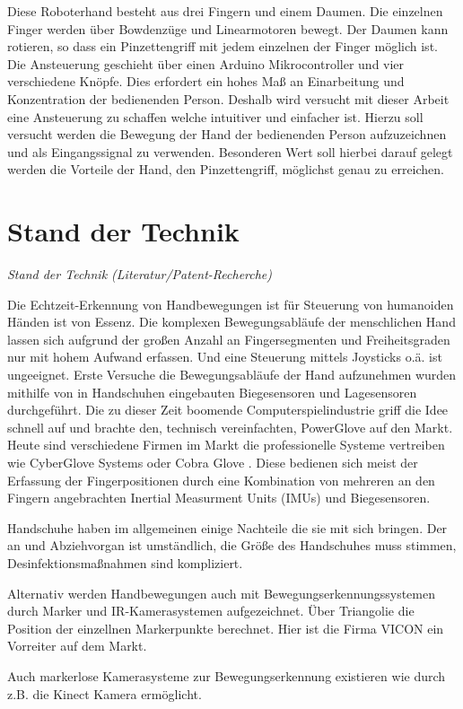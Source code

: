 \documentclass[a4paper,12pt,final]{article} %
\numberwithin{equation}{section} %
\numberwithin{figure}{section} %
\numberwithin{table}{section} %
\begin{document}
Diese Roboterhand besteht aus drei Fingern und einem Daumen. Die einzelnen Finger werden über Bowdenzüge und Linearmotoren bewegt. Der Daumen kann rotieren, so dass ein Pinzettengriff mit jedem einzelnen der Finger möglich ist.
Die Ansteuerung geschieht über einen Arduino Mikrocontroller und vier verschiedene Knöpfe. Dies erfordert ein hohes Maß an Einarbeitung und Konzentration der bedienenden Person.
Deshalb wird versucht mit dieser Arbeit eine Ansteuerung zu schaffen welche intuitiver und einfacher ist. Hierzu soll versucht werden die Bewegung der Hand der bedienenden Person aufzuzeichnen und als Eingangssignal zu verwenden.
Besonderen Wert soll hierbei darauf gelegt werden die Vorteile der Hand, den Pinzettengriff, möglichst genau zu erreichen.
\newpage
\section{Stand der Technik}
\emph{Stand der Technik (Literatur/Patent-Recherche)}

Die Echtzeit-Erkennung von Handbewegungen ist für Steuerung von humanoiden Händen ist von Essenz. Die komplexen Bewegungsabläufe der menschlichen Hand lassen sich aufgrund der großen Anzahl an Fingersegmenten und Freiheitsgraden nur mit hohem Aufwand erfassen. Und eine Steuerung mittels Joysticks o.ä. ist ungeeignet.
Erste Versuche die Bewegungsabläufe der Hand aufzunehmen wurden mithilfe von in Handschuhen eingebauten Biegesensoren \cite{FlexSensor} und Lagesensoren durchgeführt.  Die zu dieser Zeit boomende Computerspielindustrie griff die Idee schnell auf und brachte den, technisch vereinfachten, PowerGlove \cite{PowerGlove} auf den Markt. Heute sind verschiedene Firmen im Markt die professionelle Systeme vertreiben wie CyberGlove Systems \cite{CyberGlove} oder Cobra Glove \cite{CobraGlove}. Diese bedienen sich meist der Erfassung der Fingerpositionen durch eine Kombination von mehreren an den Fingern angebrachten Inertial Measurment Units (IMUs) und Biegesensoren.

Handschuhe haben im allgemeinen einige Nachteile die sie mit sich bringen. Der an und Abziehvorgan ist umständlich, die Größe des Handschuhes muss stimmen, Desinfektionsmaßnahmen sind kompliziert.

Alternativ werden Handbewegungen auch mit Bewegungserkennungssystemen durch Marker und IR-Kamerasystemen aufgezeichnet. Über Triangolie die Position der einzellnen Markerpunkte berechnet. Hier ist die Firma VICON ein Vorreiter auf dem Markt.

Auch markerlose Kamerasysteme zur Bewegungserkennung existieren wie durch z.B. die Kinect Kamera ermöglicht.
\end{document}
